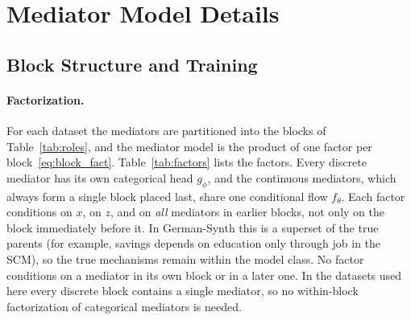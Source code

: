 \section{Mediator Model Details}
\label{app:training}

\subsection{Block Structure and Training}
\label{app:block_training}

\paragraph{Factorization.}
For each dataset the mediators are partitioned into the blocks of
Table~\ref{tab:roles}, and the mediator model is the product of one factor
per block~\eqref{eq:block_fact}. Table~\ref{tab:factors} lists the factors.
Every discrete mediator has its own categorical head $g_\phi$, and the
continuous mediators, which always form a single block placed last, share
one conditional flow $f_\theta$. Each factor conditions on $x$, on $z$, and on
\emph{all} mediators in earlier blocks, not only on the block immediately
before it. In German-Synth this is a superset of the true parents (for
example, savings depends on education only through job in the SCM), so the
true mechanisms remain within the model class. No factor conditions on a
mediator in its own block or in a later one. In the datasets used here every
discrete block contains a single mediator, so no within-block factorization of
categorical mediators is needed.

